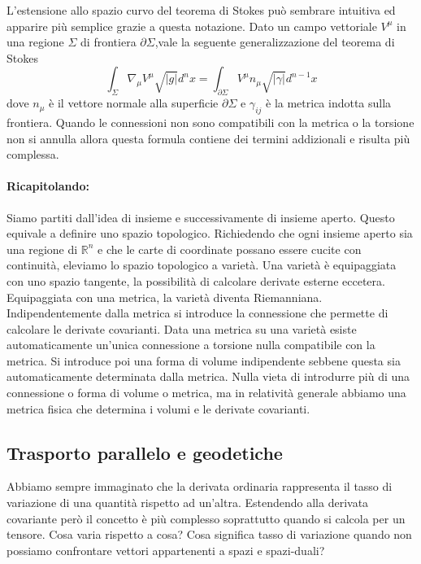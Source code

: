 \documentclass[twoside]{article}
\begin{document}
L'estensione allo spazio curvo del teorema di Stokes può sembrare intuitiva ed apparire più semplice grazie a questa notazione. Dato un campo vettoriale $V^\mu$ in una regione $\Sigma$ di frontiera $\partial \Sigma$,vale la seguente generalizzazione del teorema di Stokes 
\begin{equation}
	\boxed{
	\int_{	\Sigma } \nabla_{\mu} V^{\mu} \sqrt{|g|}d^nx = \int_{\partial \Sigma} V^{\mu} n_{\mu} \sqrt{|\gamma|} d^{n-1} x
	}
\end{equation}
dove $n_{\mu}$ è il vettore normale alla superficie $\partial \Sigma$ e $\gamma_{ij}$ è la metrica indotta sulla frontiera. Quando le connessioni non sono compatibili con la metrica o la torsione non si annulla allora questa formula contiene dei termini addizionali e risulta più complessa.

\paragraph{Ricapitolando:} Siamo partiti dall'idea di insieme e successivamente di insieme aperto. Questo equivale a definire uno spazio topologico. Richiedendo che ogni insieme aperto sia una regione di $\mathbb{R}^n$ e che le carte di coordinate possano essere cucite con continuità, eleviamo lo spazio topologico a varietà.
	Una varietà è equipaggiata con uno spazio tangente, la possibilità di calcolare derivate esterne eccetera. Equipaggiata con una metrica, la varietà diventa Riemanniana. Indipendentemente dalla metrica si introduce la connessione che permette di calcolare le derivate covarianti. Data una metrica su una varietà esiste automaticamente un'unica connessione a torsione nulla compatibile con la metrica. Si introduce poi una forma di volume indipendente sebbene questa sia automaticamente determinata dalla metrica. Nulla vieta di introdurre più di una connessione o forma di volume o metrica, ma in relatività generale abbiamo una metrica fisica che determina i volumi e le derivate covarianti.
	
\subsection{Trasporto parallelo e geodetiche} 
Abbiamo sempre immaginato che la derivata ordinaria rappresenta il tasso di variazione di una quantità rispetto ad un'altra. Estendendo alla derivata covariante però il concetto è più complesso soprattutto quando si calcola per un tensore. Cosa varia rispetto a cosa? Cosa significa tasso di variazione quando non possiamo confrontare vettori appartenenti a spazi e spazi-duali?
\end{document}
